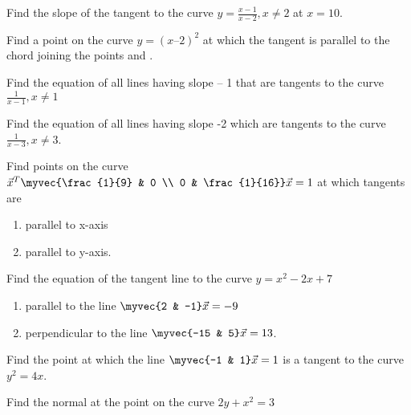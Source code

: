 \item Find the slope of the tangent to the curve $y = \frac{x-1}{x-2}, x\ne 2$ at $x = 10$.
\\
\solution

\item Find a point on the curve $y = (x – 2)^2$ at which the tangent is parallel to the chord joining the points  and .
\\
\solution

\item Find the equation of all lines having slope – 1 that are tangents to the curve $\frac{1}
{x -1}, x \ne 1$
\\
\solution 

\item Find the equation of all lines having slope -2 which are tangents to the curve $\frac{1}
{x - 3} , x \ne 3$.
%
\\
\solution 

\item Find points on the curve 
$
\vec{x}^T\myvec{\frac{1}{9} & 0 \\ 0 & \frac{1}{16}}\vec{x} = 1
$
%
at which tangents are
\begin{enumerate}
\item  parallel to x-axis
\item  parallel to y-axis.
\end{enumerate}
\solution 

\item Find the equation of the tangent line to the curve $y = x^2-2x+7$
\begin{enumerate}
%
\item  parallel to the line $\myvec{2 & -1}\vec{x}= -9$ 
\item  perpendicular to the line $\myvec{-15 & 5}\vec{x} = 13$. 
\end{enumerate}
\solution 

%
\item Find the point at which the line $\myvec{-1 & 1}\vec{x} =  1$ is a tangent to the curve $y^2 = 4x$.
%
\\
\solution 

\item  Find the normal at the point  on the curve $2y + x^2 = 3$ 
\\
\solution 

